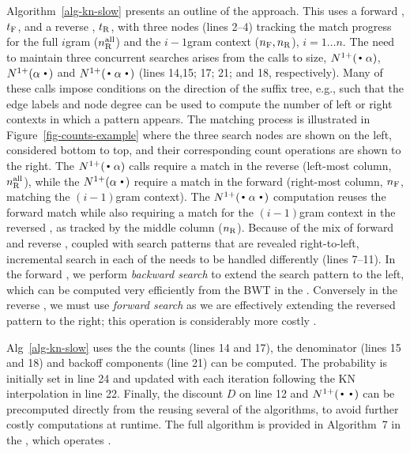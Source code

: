 Algorithm~\ref{alg-kn-slow} presents an outline of the approach.
This uses a forward \CST, $t_{\text{F}}$, and a reverse \CST, $t_{\text{R}}$, with three \CST nodes (lines 2--4) tracking the match progress for the full $i$gram ($n_{\text{R}}^{\text{all}}$) and the $i-1$gram context ($n_{\text{F}}, n_{\text{R}}$), $i=1 \ldots n$.
The need to maintain three concurrent searches arises from the calls to size, $\nlplus{\dotpat}$, $\nlplus{\patdot}$ and $\nlplus{\dotpatdot}$ (lines 14,15; 17; 21; and 18, respectively).
Many of these calls impose conditions on the direction of the suffix tree, e.g., such that the edge 
labels and node degree can be used to compute the number of left or right contexts in which a pattern appears. 
The matching process is illustrated in Figure~\ref{fig-counts-example} where the three search nodes are shown on the left, considered bottom to top, and their corresponding count operations are shown to the right.
The $\nlplus{\dotpat}$ calls require a match in the reverse \CST (left-most column, $n_{\text{R}}^{\text{all}}$), while the $\nlplus{\patdot}$ require a match in the forward \CST (right-most column, $n_{\text{F}}$, matching the $(i-1)$gram context). 
The $\nlplus{\dotpatdot}$ computation reuses the forward match while also requiring a match for the $(i-1)$gram context in the reversed \CST, as tracked by the middle column ($n_{\text{R}}$).
Because of the mix of forward and reverse \CSTs, coupled with search patterns that are revealed right-to-left, incremental search in each of the \CSTs needs to be handled differently (lines 7--11).
In the forward \CST, we perform \emph{backward search} to extend the search pattern to the left, which can be computed very efficiently from the BWT in the \CSA {}.
Conversely in the reverse \CST, we must use \emph{forward search} as we are effectively extending the reversed pattern to the right; this operation is considerably more costly .

Alg~\ref{alg-kn-slow} uses the  the counts (lines 14 and 17), the denominator (lines 15 and 18) and backoff components (line 21) can be computed.
The probability is initially set in line 24 and updated with each iteration following the KN interpolation in line 22.
Finally, the discount $D$ on line 12 and $\nlplus{\Bigcdot\Bigcdot}$ can be precomputed directly from the \CSTs reusing several of the algorithms, to avoid further costly computations at runtime. 
The full algorithm is provided in Algorithm~7 in the \supp, which operates . 


